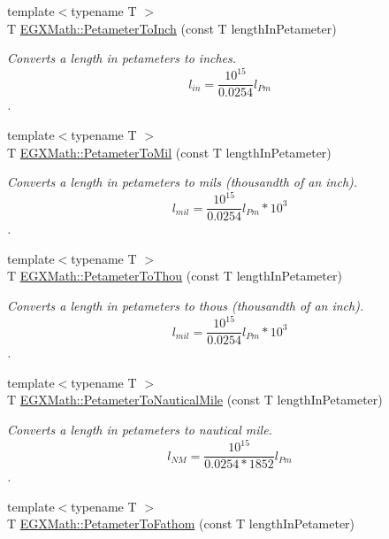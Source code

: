 \begin{DoxyCompactItemize}
{\footnotesize template$<$typename T $>$ }\\T \mbox{\hyperlink{group___e_g_x_math-_conversions-_length_conversions-_s_i-_petameter-_imperial_ga8e0128613c738b54c64e5bdd37f41b5b}{E\+G\+X\+Math\+::\+Petameter\+To\+Inch}} (const T length\+In\+Petameter)
\begin{DoxyCompactList}\small\item\em Converts a length in petameters to inches. \[ l_{in}= \frac{10^{15}}{0.0254} l_{Pm} \]. \end{DoxyCompactList}\item 
{\footnotesize template$<$typename T $>$ }\\T \mbox{\hyperlink{group___e_g_x_math-_conversions-_length_conversions-_s_i-_petameter-_imperial_ga044a0e99c9e8335dc196daf1efb9c90f}{E\+G\+X\+Math\+::\+Petameter\+To\+Mil}} (const T length\+In\+Petameter)
\begin{DoxyCompactList}\small\item\em Converts a length in petameters to mils (thousandth of an inch). \[ l_{mil}= \frac{10^{15}}{0.0254} l_{Pm} * 10^{3} \]. \end{DoxyCompactList}\item 
{\footnotesize template$<$typename T $>$ }\\T \mbox{\hyperlink{group___e_g_x_math-_conversions-_length_conversions-_s_i-_petameter-_imperial_gadcb69779fdf2696d6b9e13e2b23e6216}{E\+G\+X\+Math\+::\+Petameter\+To\+Thou}} (const T length\+In\+Petameter)
\begin{DoxyCompactList}\small\item\em Converts a length in petameters to thous (thousandth of an inch). \[ l_{mil}= \frac{10^{15}}{0.0254} l_{Pm} * 10^{3} \]. \end{DoxyCompactList}\item 
{\footnotesize template$<$typename T $>$ }\\T \mbox{\hyperlink{group___e_g_x_math-_conversions-_length_conversions-_s_i-_petameter-_nautical_gad71d96fd4a94e830ae0e768a41d993af}{E\+G\+X\+Math\+::\+Petameter\+To\+Nautical\+Mile}} (const T length\+In\+Petameter)
\begin{DoxyCompactList}\small\item\em Converts a length in petameters to nautical mile. \[ l_{NM}= \frac{10^{15}}{0.0254 * 1852} l_{Pm} \]. \end{DoxyCompactList}\item 
{\footnotesize template$<$typename T $>$ }\\T \mbox{\hyperlink{group___e_g_x_math-_conversions-_length_conversions-_s_i-_petameter-_nautical_ga889ce7d71b84adea6f568fed8857fbab}{E\+G\+X\+Math\+::\+Petameter\+To\+Fathom}} (const T length\+In\+Petameter)

\end{DoxyCompactItemize}
